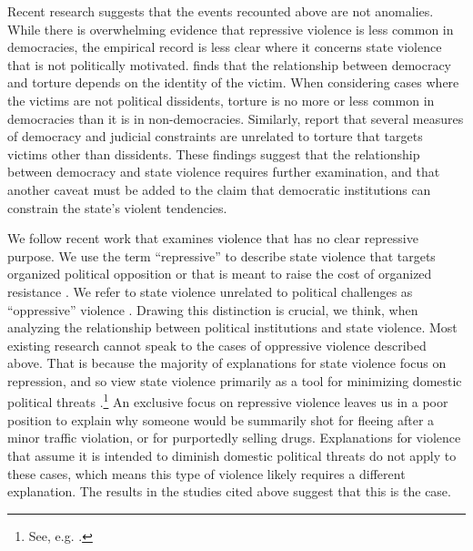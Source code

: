 \documentclass[11pt]{article}
\begin{document}
Recent research suggests that the events recounted above are not anomalies. While there is overwhelming evidence that repressive violence is less common in democracies, the empirical record is less clear where it concerns state violence that is not politically motivated. \citet{Haschke2018} finds that the relationship between democracy and torture depends on the identity of the victim. When considering cases where the victims are not political dissidents, torture is no more or less common in democracies than it is in non-democracies. Similarly, \citet{JacksonHillHall2018} report that several measures of democracy and judicial constraints are unrelated to torture that targets victims other than dissidents. These findings suggest that the relationship between democracy and state violence requires further examination, and that another caveat must be added to the claim that democratic institutions can constrain the state's violent tendencies.     
   
We follow recent work that examines violence that has no clear repressive purpose. We use the term ``repressive'' to describe state violence that targets organized political opposition or that is meant to raise the cost of organized resistance \citep{Bisselletal1978,Tilly1978, Goldstein1978, StohlLopez1984,Davenport2007AR}. We refer to state violence unrelated to political challenges as ``oppressive'' violence \citep{Bisselletal1978}. Drawing this distinction is crucial, we think, when analyzing the relationship between political institutions and state violence. Most existing research cannot speak to the cases of oppressive violence described above. That is because the majority of explanations for state violence focus on repression, and so view state violence primarily as a tool for minimizing domestic political threats \citep{Haschke2018}.\footnote{See, e.g. \citep{Davenport1995,Poe2004,Pierskalla2010,Ritter2014,RitterConrad2016}.} An exclusive focus on repressive violence leaves us in a poor position to explain why someone would be summarily shot for fleeing after a minor traffic violation, or for purportedly selling drugs. 
Explanations for violence that assume it is intended to diminish domestic political threats do not apply to these cases, which means this type of violence likely requires a different explanation. The results in the studies cited above suggest that this is the case.  
\end{document}
